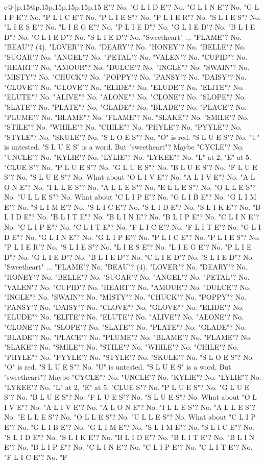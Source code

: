 \documentclass{article}
\begin{document}
{\begin{supertabular}{c@{$\;$}|p{.15\linewidth}@{}p{.15\linewidth}p{.15\linewidth}p{.15\linewidth}p{.15\linewidth}p{.15\linewidth}}
{{{E"? No. "G L I D E"? No. "G L I N E"? No. "G L I P E"? No. "P L I C E"? No. "P L I E S"? No. "P L I E R"? No. "S L I E S"? No. "L I E S E"? No. "L I E G E"? No. "P L I E D"? No. "G L I E D"? No. "B L I E D"? No. "C L I E D"? No. "S L I E D"? No. "Sweetheart" ... "FLAME"? No. "BEAU"? (4). "LOVER"? No. "DEARY"? No. "HONEY"? No. "BELLE"? No. "SUGAR"? No. "ANGEL"? No. "PETAL"? No. "VALEN"? No. "CUPID"? No. "HEART"? No. "AMOUR"? No. "DULCE"? No. "INGLE"? No. "SWAIN"? No. "MISTY"? No. "CHUCK"? No. "POPPY"? No. "PANSY"? No. "DAISY"? No. "CLOVE"? No. "GLOVE"? No. "ELIDE"? No. "ELUDE"? No. "ELITE"? No. "ELUTE"? No. "ALIVE"? No. "ALONE"? No. "CLONE"? No. "SLOPE"? No. "SLATE"? No. "PLATE"? No. "GLADE"? No. "BLADE"? No. "PLACE"? No. "PLUME"? No. "BLAME"? No. "FLAME"? No. "SLAKE"? No. "SMILE"? No. "STILE"? No. "WHILE"? No. "CHILE"? No. "PHYLE"? No. "PYYLE"? No. "STYLE"? No. "SKULE"? No. "S L O E S"? No. "O" is red. "S L U E S"? No. "U" is untested. "S L U E S" is a word. But "sweetheart"? Maybe "CYCLE"? No. "UNCLE"? No. "KYLIE"? No. "LYLIE"? No. "LYKEE"? No. "L" at 2, "E" at 5. "CLUE S"? No. "P L U E S"? No. "G L U E S"? No. "B L U E S"? No. "F L U E S"? No. "S L U E S"? No. What about "O L I V E"? No. "A L I V E"? No. "A L O N E"? No. "I L L E S"? No. "A L L E S"? No. "E L L E S"? No. "O L L E S"? No. "U L L E S"? No. What about "C L I P E"? No. "G L I B E"? No. "G L I M E"? No. "S L I M E"? No. "S L I C E"? No. "S L I D E"? No. "S L I K E"? No. "B L I D E"? No. "B L I T E"? No. "B L I N E"? No. "B L I P E"? No. "C L I N E"? No. "C L I P E"? No. "C L I T E"? No. "F L I C E"? No. "F L I T E"? No. "G L I D E"? No. "G L I N E"? No. "G L I P E"? No. "P L I C E"? No. "P L I E S"? No. "P L I E R"? No. "S L I E S"? No. "L I E S E"? No. "L I E G E"? No. "P L I E D"? No. "G L I E D"? No. "B L I E D"? No. "C L I E D"? No. "S L I E D"? No. "Sweetheart" ... "FLAME"? No. "BEAU"? (4). "LOVER"? No. "DEARY"? No. "HONEY"? No. "BELLE"? No. "SUGAR"? No. "ANGEL"? No. "PETAL"? No. "VALEN"? No. "CUPID"? No. "HEART"? No. "AMOUR"? No. "DULCE"? No. "INGLE"? No. "SWAIN"? No. "MISTY"? No. "CHUCK"? No. "POPPY"? No. "PANSY"? No. "DAISY"? No. "CLOVE"? No. "GLOVE"? No. "ELIDE"? No. "ELUDE"? No. "ELITE"? No. "ELUTE"? No. "ALIVE"? No. "ALONE"? No. "CLONE"? No. "SLOPE"? No. "SLATE"? No. "PLATE"? No. "GLADE"? No. "BLADE"? No. "PLACE"? No. "PLUME"? No. "BLAME"? No. "FLAME"? No. "SLAKE"? No. "SMILE"? No. "STILE"? No. "WHILE"? No. "CHILE"? No. "PHYLE"? No. "PYYLE"? No. "STYLE"? No. "SKULE"? No. "S L O E S"? No. "O" is red. "S L U E S"? No. "U" is untested. "S L U E S" is a word. But "sweetheart"? Maybe "CYCLE"? No. "UNCLE"? No. "KYLIE"? No. "LYLIE"? No. "LYKEE"? No. "L" at 2, "E" at 5. "CLUE S"? No. "P L U E S"? No. "G L U E S"? No. "B L U E S"? No. "F L U E S"? No. "S L U E S"? No. What about "O L I V E"? No. "A L I V E"? No. "A L O N E"? No. "I L L E S"? No. "A L L E S"? No. "E L L E S"? No. "O L L E S"? No. "U L L E S"? No. What about "C L I P E"? No. "G L I B E"? No. "G L I M E"? No. "S L I M E"? No. "S L I C E"? No. "S L I D E"? No. "S L I K E"? No. "B L I D E"? No. "B L I T E"? No. "B L I N E"? No. "B L I P E"? No. "C L I N E"? No. "C L I P E"? No. "C L I T E"? No. "F L I C E"? No. "F }}}
\end{supertabular}}
\end{document}
